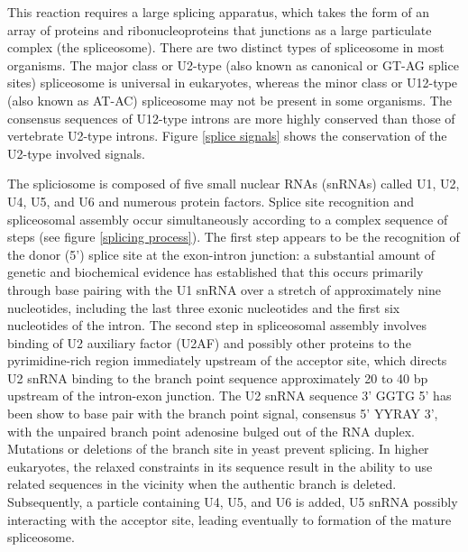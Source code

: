 This reaction requires a large splicing apparatus, which takes the
form of an array of proteins and ribonucleoproteins that junctions as
a large particulate complex (the spliceosome). There are two distinct
types of spliceosome in most organisms. The major class or U2-type
(also known as canonical or GT-AG splice sites) spliceosome is
universal in eukaryotes, whereas the minor class or U12-type (also
known as AT-AC) spliceosome may not be present in some organisms. The
consensus sequences of U12-type introns are more highly conserved than
those of vertebrate U2-type introns. Figure \ref{splice signals} shows
the conservation of the U2-type involved signals.

The spliciosome is composed of five small nuclear RNAs (snRNAs) called
U1, U2, U4, U5, and U6 and numerous protein factors. Splice site
recognition and spliceosomal assembly occur simultaneously according
to a complex sequence of steps (see figure \ref{splicing process}).
The first step appears to be the recognition of the donor (5') splice
site at the exon-intron junction: a substantial amount of genetic and
biochemical evidence has established that this occurs primarily
through base pairing with the U1 snRNA over a stretch of approximately
nine nucleotides, including the last three exonic nucleotides and the
first six nucleotides of the intron. The second step in spliceosomal
assembly involves binding of U2 auxiliary factor (U2AF) and possibly
other proteins to the pyrimidine-rich region immediately upstream of
the acceptor site, which directs U2 snRNA binding to the branch point
sequence approximately 20 to 40 bp upstream of the intron-exon
junction.  The U2 snRNA sequence 3' GGTG 5' has been show to base pair
with the branch point signal, consensus 5' YYRAY 3', with the unpaired
branch point adenosine bulged out of the RNA duplex.  Mutations or
deletions of the branch site in yeast prevent splicing. In higher
eukaryotes, the relaxed constraints in its sequence result in the
ability to use related sequences in the vicinity when the authentic
branch is deleted. Subsequently, a particle containing U4, U5, and U6
is added, U5 snRNA possibly interacting with the acceptor site,
leading eventually to formation of the mature spliceosome.

